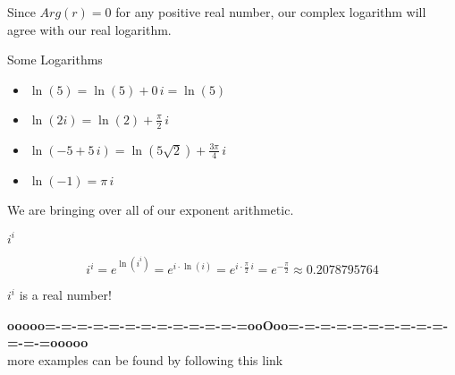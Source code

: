\documentclass{ximera}
\begin{document}
Since $Arg(r) = 0$ for any positive real number, our complex logarithm will agree with our real logarithm.








\begin{example} Some Logarithms


\begin{itemize}
\item $\ln(5) = \ln(5) + 0 \, i = \ln(5)$

\item $\ln(2i) = \ln(2) + \frac{\pi}{2} \, i$

\item $\ln(-5 + 5 \, i) = \ln(5 \sqrt{2}) + \frac{3\pi}{4}\, i$

\item $\ln(-1) = \pi \, i$



\end{itemize}




\end{example}







We are bringing over all of our exponent arithmetic.



\begin{example}  $i^i$


\[    i^i =  e^{\ln(i^i)} = e^{i \cdot \ln(i)} = e^{ i \cdot \tfrac{\pi}{2} \, i}   = e^{-\tfrac{\pi}{2}} \approx  0.2078795764\]



\begin{center}

$i^i$ is a real number!
\end{center}


\end{example}




























\begin{center}
\textbf{\textcolor{green!50!black}{ooooo=-=-=-=-=-=-=-=-=-=-=-=-=ooOoo=-=-=-=-=-=-=-=-=-=-=-=-=ooooo}} \\

more examples can be found by following this link\\ 

\end{center}
\end{document}
